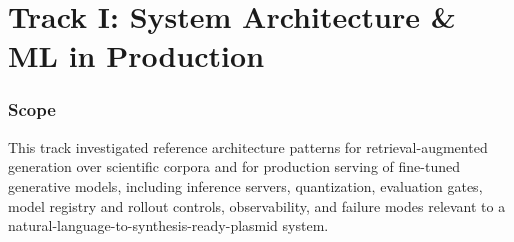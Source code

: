 \documentclass[11pt]{report}
\begin{document}
\chapter{Track I: System Architecture \& ML in Production}

\subsection{Scope}
This track investigated reference architecture patterns for retrieval-augmented generation over scientific corpora and for production serving of fine-tuned generative models, including inference servers, quantization, evaluation gates, model registry and rollout controls, observability, and failure modes relevant to a natural-language-to-synthesis-ready-plasmid system.\par
\end{document}
